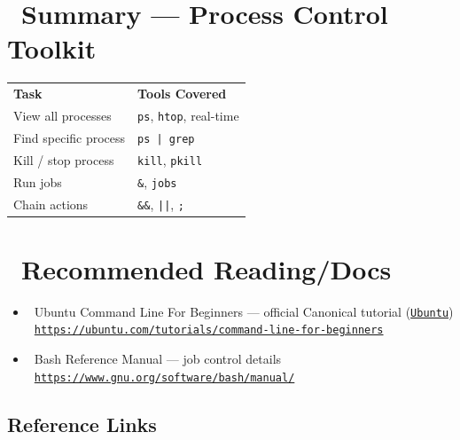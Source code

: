 \documentclass[12pt]{article}
\newcommand{\penguinicon}{\faLinux}
\newcommand{\summaryicon}{\faList}
\newcommand{\bookicon}{\faBook}
\newcommand{\arrowicon}{\faArrowRight}
\begin{document}
\section*{\summaryicon\ Summary — Process Control Toolkit}

\begin{infobox}
\begin{tabular}{ll}
\textbf{Task} & \textbf{Tools Covered} \\
View all processes & \texttt{ps}, \texttt{htop}, real-time \\
Find specific process & \texttt{ps | grep} \\
Kill / stop process & \texttt{kill}, \texttt{pkill} \\
Run jobs & \texttt{\&}, \texttt{jobs} \\
Chain actions & \texttt{\&\&}, \texttt{||}, \texttt{;} \\
\end{tabular}
\end{infobox}

\section*{\bookicon\ Recommended Reading/Docs}

\begin{itemize}
    \item \penguinicon\ Ubuntu Command Line For Beginners — official Canonical tutorial (\href{https://ubuntu.com/tutorials/command-line-for-beginners}{\texttt{Ubuntu}})\\
    \arrowicon\ \href{https://ubuntu.com/tutorials/command-line-for-beginners}{\texttt{https://ubuntu.com/tutorials/command-line-for-beginners}}
    
    \item \penguinicon\ Bash Reference Manual — job control details\\
    \arrowicon\ \href{https://www.gnu.org/software/bash/manual/}{\texttt{https://www.gnu.org/software/bash/manual/}}
\end{itemize}

\subsection*{Reference Links}
\end{document}
